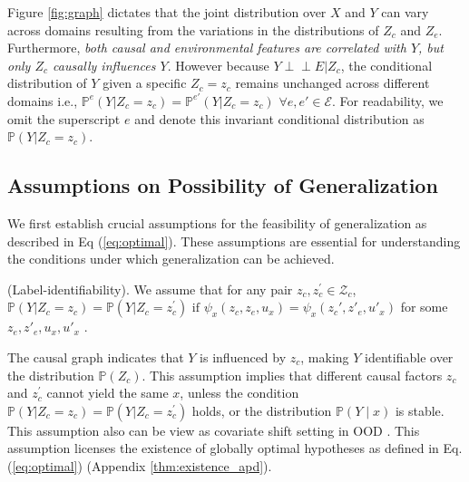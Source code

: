 Figure \ref{fig:graph} dictates that the joint distribution over $X$ and $Y$ can vary across domains resulting from the variations in the distributions of $Z_c$ and $Z_e$. Furthermore, \textit{both causal and environmental features are correlated with $Y$, but only $Z_c$ causally influences $Y$}.  However because $Y \perp\!\!\!\perp E | Z_c$, the conditional distribution of $Y$ given a specific $Z_c = z_c$ remains unchanged across different domains i.e., $\mathbb{P}^e(Y | Z_c = z_c) = \mathbb{P}^{e'}(Y | Z_c = z_c)$ $\forall e, e' \in \mathcal{E}$. For readability, we omit the superscript $e$ and denote this invariant conditional distribution as $\mathbb{P}(Y | Z_c = z_c)$. 
\subsection{Assumptions on Possibility of Generalization}

We first establish crucial assumptions for the feasibility of generalization as described in Eq (\ref{eq:optimal}). These assumptions are essential for understanding the conditions under which generalization can be achieved. 



\begin{assumption} (Label-identifiability). We assume that for any pair $z_c, z^{'}_c\in \mathcal{Z}_c$,  $\mathbb{P}(Y|Z_c=z_c) = \mathbb{P}(Y|Z_c=z^{'}_c) \text{ if } \psi_x(z_c,z_e,u_x)=\psi_x(z_c',z'_e,u'_x)$ for some $z_e, z'_e, u_x, u'_x$
\label{as:label_idf}.
\end{assumption}

The causal graph indicates that $Y$ is influenced by $z_c$, making $Y$ identifiable over the distribution $\mathbb{P}(Z_c)$. This assumption implies that different causal factors $z_c$ and $z^{'}_c$ cannot yield the same $x$, unless the condition $\mathbb{P}(Y|Z_c=z_c) = \mathbb{P}(Y|Z_c=z^{'}_c)$ holds, or  the distribution $\mathbb{P}(Y\mid x)$ is stable. This assumption also can be view as covariate shift setting in OOD 
\citep{shimodaira2000improving}. This assumption licenses the existence of globally optimal hypotheses as defined in Eq. (\ref{eq:optimal}) (Appendix \ref{thm:existence_apd}). 



